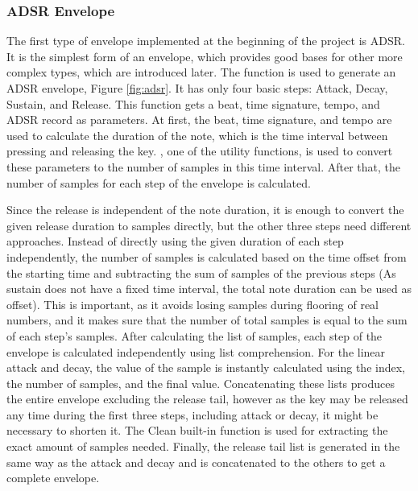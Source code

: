 \documentclass[runningheads]{llncs}
\begin{document}
\subsubsection{ADSR Envelope}
The first type of envelope implemented at the beginning of the project is ADSR. It is the simplest form of an envelope, which provides good bases for other more complex types, which are introduced later. The  function is used to generate an ADSR envelope, Figure \ref{fig:adsr}. It has only four basic steps: Attack, Decay, Sustain, and Release. This function gets a beat\label{gloss:beat}, time signature, tempo\label{gloss:tempo}, and ADSR record as parameters. At first, the beat, time signature, and tempo are used to calculate the duration of the note, which is the time interval between pressing and releasing the key. , one of the utility functions, is used to convert these parameters to the number of samples in this time interval. After that, the number of samples for each step of the envelope is calculated.

Since the release is independent of the note duration, it is enough to convert the given release duration to samples directly, but the other three steps need different approaches. Instead of directly using the given duration of each step independently, the number of samples is calculated based on the time offset from the starting time and subtracting the sum of samples of the previous steps (As sustain does not have a fixed time interval, the total note duration can be used as offset). This is important, as it avoids losing samples during flooring\label{gloss:Flooring} of real numbers, and it makes sure that the number of total samples is equal to the sum of each step’s samples. After calculating the list of samples, each step of the envelope is calculated independently using list comprehension. For the linear attack and decay, the value of the sample is instantly calculated using the index, the number of samples, and the final value. Concatenating these lists produces the entire envelope excluding the release tail, however as the key may be released any time during the first three steps, including attack or decay, it might be necessary to shorten it. The Clean built-in function  is used for extracting the exact amount of samples needed. Finally, the release tail list is generated in the same way as the attack and decay and is concatenated to the others to get a complete envelope.
\end{document}
